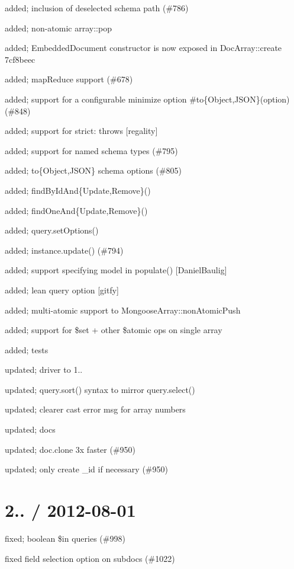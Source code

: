 \begin{DoxyItemize}
\item added; inclusion of deselected schema path (\#786)
\item added; non-\/atomic array\+::pop
\item added; Embedded\+Document constructor is now exposed in Doc\+Array\+::create 7cf8beec
\item added; map\+Reduce support (\#678)
\item added; support for a configurable minimize option \#to\{Object,J\+S\+ON\}(option) (\#848)
\item added; support for strict\+: {\ttfamily throws} \mbox{[}regality\mbox{]}
\item added; support for named schema types (\#795)
\item added; to\{Object,J\+S\+ON\} schema options (\#805)
\item added; find\+By\+Id\+And\{Update,Remove\}()
\item added; find\+One\+And\{Update,Remove\}()
\item added; query.\+set\+Options()
\item added; instance.\+update() (\#794)
\item added; support specifying model in populate() \mbox{[}Daniel\+Baulig\mbox{]}
\item added; {\ttfamily lean} query option \mbox{[}gitfy\mbox{]}
\item added; multi-\/atomic support to Mongoose\+Array\+::non\+Atomic\+Push
\item added; support for \$set + other \$atomic ops on single array
\item added; tests
\item updated; driver to 1..
\item updated; query.\+sort() syntax to mirror query.\+select()
\item updated; clearer cast error msg for array numbers
\item updated; docs
\item updated; doc.\+clone 3x faster (\#950)
\item updated; only create \+\_\+id if necessary (\#950)
\end{DoxyItemize}

\section*{2.. / 2012-\/08-\/01 }


\begin{DoxyItemize}
\item fixed; boolean \$in queries (\#998)
\item fixed field selection option on subdocs (\#1022)
\end{DoxyItemize}

